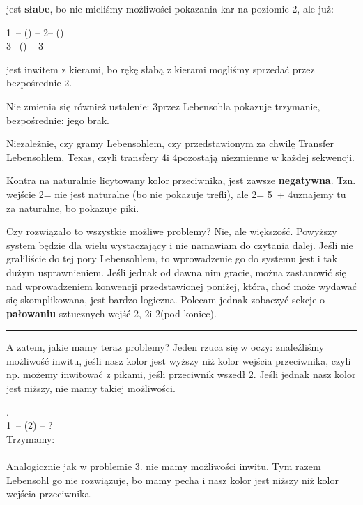 \documentclass[12pt, a4paper]{article}
\begin{document}
jest \textbf{słabe}, bo nie mieliśmy możliwości pokazania kar na poziomie 2, ale już:

1\nt\ -- (\alrts{2\diams}) -- 2\nt -- (\pass)\\
3\clubs -- (\pass) -- 3\hearts

jest inwitem z kierami, bo rękę słabą z kierami mogliśmy sprzedać przez bezpośrednie 2\hearts.

Nie zmienia się również ustalenie: 3\nt przez Lebensohla pokazuje trzymanie, bezpośrednie: jego brak.

\begin{formal}
    Niezależnie, czy gramy Lebensohlem, czy przedstawionym
    za chwilę Transfer Lebensohlem, Texas, czyli transfery
    4\diams i 4\hearts pozostają niezmienne w każdej sekwencji.
\end{formal}

\begin{formal}
    Kontra na naturalnie licytowany kolor przeciwnika, jest zawsze \textbf{negatywna}.
    Tzn. wejście 2\clubs = \major nie jest naturalne (bo nie pokazuje trefli),
    ale 2\spades = 5\spades\ + 4\minor uznajemy tu za naturalne,
    bo pokazuje piki.
\end{formal}

Czy rozwiązało to wszystkie możliwe problemy? Nie, ale większość. Powyższy system
będzie dla wielu wystaczający i nie namawiam do czytania dalej. Jeśli nie graliliście do tej pory
Lebensohlem, to wprowadzenie go do systemu jest i tak dużym usprawnieniem. Jeśli jednak od dawna 
nim gracie, można zastanowić się nad wprowadzeniem konwencji przedstawionej poniżej, która, choć może
wydawać się skomplikowana, jest bardzo logiczna. Polecam jednak
zobaczyć sekcje o \textbf{pałowaniu} sztucznych wejść 2\clubs, 2\diams i 2\nt (pod koniec).

\vspace{0.4cm}
\hrule

A zatem, jakie mamy teraz problemy? Jeden rzuca się w oczy: znaleźliśmy możliwość inwitu, jeśli
nasz kolor jest wyższy niż kolor wejścia przeciwnika, czyli np. możemy inwitować z pikami, jeśli
przeciwnik wszedł 2\hearts. Jeśli jednak nasz kolor jest niższy, nie mamy takiej możliwości.

\vspace{0.3cm}
.\\
1\nt\ -- (2\spades) -- ?\\
Trzymamy:\\
\\
Analogicznie jak w problemie 3. nie mamy możliwości inwitu. Tym razem Lebensohl go nie rozwiązuje,
bo mamy pecha i nasz kolor jest niższy niż kolor wejścia przeciwnika.
\end{document}
